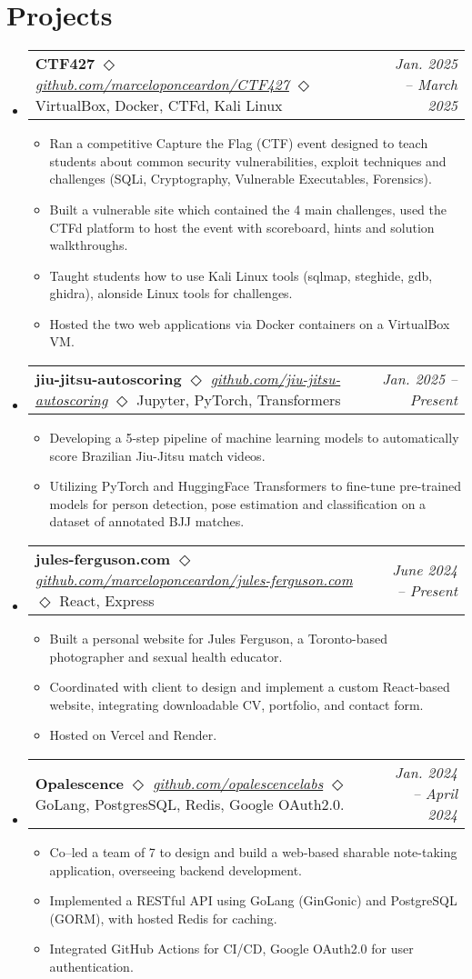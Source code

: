 \documentclass[letterpaper,11pt]{article}
\makeatletter
\newcommand{\resumeItem}[1]{
  \item\small{
    {#1 \vspace{-2pt}}
  }
}
\newcommand{\resumeProjectHeading}[2]{
    \item
    \begin{tabular*}{0.97\textwidth}{l@{\extracolsep{\fill}}r}
      \small#1 & #2 \\
    \end{tabular*}\vspace{-7pt}
}
\newcommand{\resumeSubHeadingListStart}{\begin{itemize}[leftmargin=0.15in, label={}]}
\newcommand{\resumeSubHeadingListEnd}{\end{itemize}}
\newcommand{\resumeItemListStart}{\begin{itemize}}
\newcommand{\resumeItemListEnd}{\end{itemize}\vspace{-5pt}}
\makeatother
\begin{document}
\section{Projects}
    \resumeSubHeadingListStart
      \resumeProjectHeading
      {\textbf{CTF427} $\Diamond$ \textit{\href{https://github.com/marceloponceardon/CTF427}{github.com/marceloponceardon/CTF427}} $\Diamond$ {\footnotesize VirtualBox, Docker, CTFd, Kali Linux}}{\emph{Jan. 2025 -- March 2025}}
          \resumeItemListStart
	  \resumeItem{Ran a competitive Capture the Flag (CTF) event designed to teach students about common security vulnerabilities, exploit techniques and challenges (SQLi, Cryptography, Vulnerable Executables, Forensics).}
	  \resumeItem{Built a vulnerable site which contained the 4 main challenges, used the CTFd platform to host the event with scoreboard, hints and solution walkthroughs.}
	  \resumeItem{Taught students how to use Kali Linux tools (sqlmap, steghide, gdb, ghidra), alonside Linux tools for challenges.}
	  \resumeItem{Hosted the two web applications via Docker containers on a VirtualBox VM.}
          \resumeItemListEnd
      \resumeProjectHeading
      {\textbf{jiu-jitsu-autoscoring} $\Diamond$ \textit{\href{https://github.com/jiu-jitsu-autoscoring}{github.com/jiu-jitsu-autoscoring}} $\Diamond$ {\footnotesize Jupyter, PyTorch, Transformers}}{\emph{Jan. 2025 -- Present}}
          \resumeItemListStart
	  \resumeItem{Developing a 5-step pipeline of machine learning models to automatically score Brazilian Jiu-Jitsu match videos.}
	  \resumeItem{Utilizing PyTorch and HuggingFace Transformers to fine-tune pre-trained models for person detection, pose estimation and classification on a dataset of annotated BJJ matches.}
          \resumeItemListEnd
      \resumeProjectHeading
      {\textbf{jules-ferguson.com} $\Diamond$ \textit{\href{https://github.com/marceloponceardon/jules-ferguson.com}{github.com/marceloponceardon/jules-ferguson.com}} $\Diamond$ {\footnotesize React, Express} }{\emph{June 2024 -- Present}}
	  \resumeItemListStart
	  \resumeItem{Built a personal website for Jules Ferguson, a Toronto-based photographer and sexual health educator.}
	  \resumeItem{Coordinated with client to design and implement a custom React-based website, integrating downloadable CV, portfolio, and contact form.}
	  \resumeItem{Hosted on Vercel and Render.}
	  \resumeItemListEnd
      \resumeProjectHeading
      {\textbf{Opalescence} $\Diamond$ \textit{\href{https://github.com/opalescencelabs}{github.com/opalescencelabs}} $\Diamond$ {\footnotesize GoLang, PostgresSQL, Redis, Google OAuth2.0.}}{\emph{Jan. 2024 -- April 2024}}
          \resumeItemListStart
	  \resumeItem{Co--led a team of 7 to design and build a web-based sharable note-taking application, overseeing backend development.}
	  \resumeItem{Implemented a RESTful API using GoLang (GinGonic) and PostgreSQL (GORM), with hosted Redis for caching.}
	  \resumeItem{Integrated GitHub Actions for CI/CD, Google OAuth2.0 for user authentication.}
          \resumeItemListEnd
    \resumeSubHeadingListEnd
\end{document}
